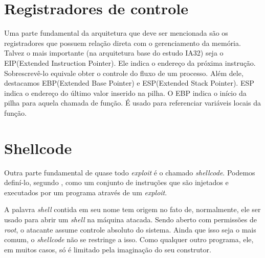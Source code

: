 	\section{Registradores de controle}
	Uma parte fundamental da arquitetura que deve ser mencionada são os registradores que possuem
	relação direta com o gerenciamento da memória.
	Talvez o mais importante (na arquitetura base do estudo IA32) seja o EIP(Extended Instruction Pointer).
	Ele indica o endereço da próxima instrução. Sobrescrevê-lo equivale obter o controle
	do fluxo de um processo.
	Além dele, destacamos EBP(Extended Base Pointer) e ESP(Extended Stack Pointer).
	ESP indica o endereço do último valor inserido na pilha.
	O EBP indica o início da pilha para aquela chamada de função. É usado para referenciar variáveis
	locais da função.

	\section{Shellcode}
	Outra parte fundamental de quase todo \textsl{exploit} é o chamado \textsl{shellcode}.
	Podemos definí-lo, segundo \cite{Anley2007}, como um conjunto de instruções que são injetados
	e executados por um programa através de um \textsl{exploit}. 


	A palavra \textsl{shell} contida em seu nome tem origem no fato de, normalmente, ele ser usado
	para abrir um \textsl{shell} na máquina atacada. Sendo aberto com permissões de \textsl{root},
	o atacante assume controle absoluto do sistema. Ainda que isso seja o mais comum, o \textsl{shellcode}
	não se restringe a isso. Como qualquer outro programa, ele, em muitos casos, só é limitado pela imaginação
	do seu construtor.
	
